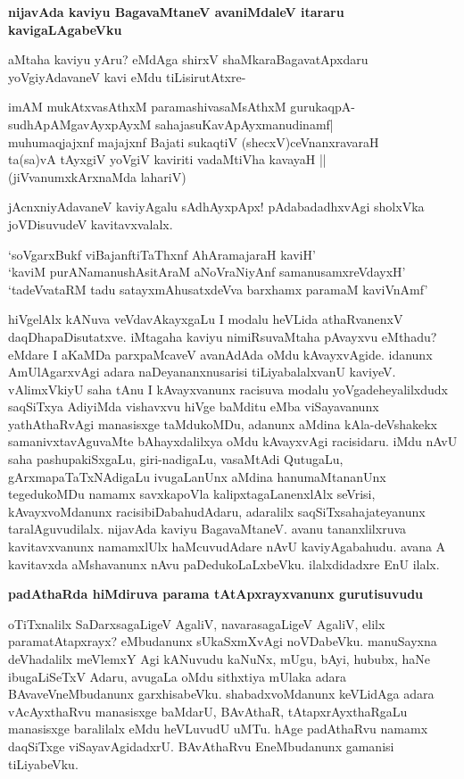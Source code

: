 \noindent
{\bf\large{nijavAda kaviyu BagavaMtaneV avaniMdaleV itararu kavigaLAgabeVku}}\label{page239}

aMtaha kaviyu yAru? eMdAga shirxV shaMkaraBagavatApxdaru yoVgiyAdavaneV kavi eMdu tiLisirutAtxre-

\begin{shloka}
imAM mukAtxvasAthxM paramashivasaMsAthxM gurukaqpA-\\\label{239}
sudhApAMgavAyxpAyxM sahajasuKavApAyxmanudinamf|\\
muhumaqjajxnf majajxnf Bajati sukaqtiV (shecxV)ceVnanxravaraH\\
ta(sa)vA tAyxgiV yoVgiV kaviriti vadaMtiVha kavayaH || (jiVvanumxkArxnaMda lahariV)
\end{shloka}

jAcnxniyAdavaneV kaviyAgalu sAdhAyxpApx! pAdabadadhxvAgi sholxVka joVDisuvudeV kavitavxvalalx.

\begin{shloka}
`soVgarxBukf viBajanftiTaThxnf AhAramajaraH kaviH'\\\label{239}
`kaviM purANamanushAsitAraM aNoVraNiyAnf samanusamxreVdayxH'\\
`tadeVvataRM tadu satayxmAhusatxdeVva barxhamx paramaM kaviVnAmf'\label{239}
\end{shloka}                    

hiVgelAlx kANuva veVdavAkayxgaLu I modalu heVLida athaRvanenxV daqDhapaDisutatxve. iMtagaha kaviyu nimiRsuvaMtaha pAvayxvu eMthadu? eMdare I aKaMDa parxpaMcaveV avanAdAda oMdu kAvayxvAgide. idanunx AmUlAgarxvAgi adara naDeyananxnusarisi tiLiyabalalxvanU kaviyeV. vAlimxVkiyU saha tAnu I kAvayxvanunx racisuva modalu yoVgadeheyalilxdudx saqSiTxya AdiyiMda vishavxvu hiVge baMditu eMba viSayavanunx yathAthaRvAgi manasisxge taMdukoMDu, adanunx aMdina kAla-deVshakekx samanivxtavAguvaMte bAhayxdalilxya oMdu kAvayxvAgi racisidaru. iMdu nAvU saha pashupakiSxgaLu, giri-nadigaLu, vasaMtAdi QutugaLu, gArxmapaTaTxNAdigaLu ivugaLanUnx aMdina hanumaMtananUnx tegedukoMDu namamx savxkapoVla kalipxtagaLanenxlAlx seVrisi, kAvayxvoMdanunx racisibiDabahudAdaru, adaralilx saqSiTxsahajateyanunx taralAguvudilalx. nijavAda kaviyu BagavaMtaneV. avanu tananxlilxruva kavitavxvanunx namamxlUlx haMcuvudAdare nAvU kaviyAgabahudu. avana A kavitavxda aMshavanunx nAvu paDedukoLaLxbeVku. ilalxdidadxre EnU ilalx.

\noindent
{\bf\large{padAthaRda hiMdiruva parama tAtApxrayxvanunx gurutisuvudu}}\label{page240}

oTiTxnalilx SaDarxsagaLigeV AgaliV, navarasagaLigeV AgaliV, elilx paramatAtapxrayx? eMbudanunx sUkaSxmXvAgi noVDabeVku. manuSayxna deVhadalilx meVlemxY Agi kANuvudu kaNuNx, mUgu, bAyi, hububx, haNe ibugaLiSeTxV Adaru, avugaLa oMdu sithxtiya mUlaka adara BAvaveVneMbudanunx garxhisabeVku. shabadxvoMdanunx keVLidAga adara vAcAyxthaRvu manasisxge baMdarU, BAvAthaR, tAtapxrAyxthaRgaLu manasisxge baralilalx eMdu heVLuvudU uMTu. hAge padAthaRvu namamx daqSiTxge viSayavAgidadxrU. BAvAthaRvu EneMbudanunx gamanisi tiLiyabeVku.

